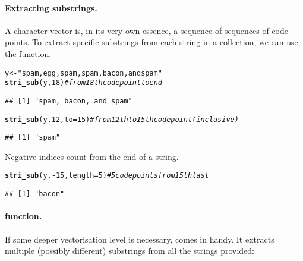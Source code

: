 \documentclass[nojss]{jss}\usepackage[]{graphicx}\usepackage[]{xcolor}
\makeatletter
\newcommand{\hlnum}[1]{\textcolor[rgb]{0.686,0.059,0.569}{#1}}%
\newcommand{\hlstr}[1]{\textcolor[rgb]{0.192,0.494,0.8}{#1}}%
\newcommand{\hlcom}[1]{\textcolor[rgb]{0.678,0.584,0.686}{\textit{#1}}}%
\newcommand{\hlopt}[1]{\textcolor[rgb]{0,0,0}{#1}}%
\newcommand{\hlstd}[1]{\textcolor[rgb]{0.345,0.345,0.345}{#1}}%
\newcommand{\hlkwb}[1]{\textcolor[rgb]{0.69,0.353,0.396}{#1}}%
\newcommand{\hlkwc}[1]{\textcolor[rgb]{0.333,0.667,0.333}{#1}}%
\newcommand{\hlkwd}[1]{\textcolor[rgb]{0.737,0.353,0.396}{\textbf{#1}}}%
\newenvironment{kframe}{%
 \def\at@end@of@kframe{}%
 \ifinner\ifhmode%
  \def\at@end@of@kframe{\end{minipage}}%
  \begin{minipage}{\columnwidth}%
 \fi\fi%
 \def\FrameCommand##1{\hskip\@totalleftmargin \hskip-\fboxsep
 \colorbox{shadecolor}{##1}\hskip-\fboxsep
     \hskip-\linewidth \hskip-\@totalleftmargin \hskip\columnwidth}%
 \MakeFramed {\advance\hsize-\width
   \@totalleftmargin\z@ \linewidth\hsize
   \@setminipage}}%
 {\par\unskip\endMakeFramed%
 \at@end@of@kframe}
\newenvironment{knitrout}{}{} %
\makeatother
\begin{document}
\paragraph{Extracting substrings.}
A character vector is, in its very own essence, a sequence of
sequences of code points.
To extract specific substrings from each string in a collection,
we can use the  function.

\begin{knitrout}
\color{fgcolor}\begin{kframe}
\begin{alltt}
\hlstd{y} \hlkwb{<-} \hlstr{"spam, egg, spam, spam, bacon, and spam"}
\hlkwd{stri_sub}\hlstd{(y,} \hlnum{18}\hlstd{)}             \hlcom{# from 18th code point to end}
\end{alltt}
\begin{verbatim}
## [1] "spam, bacon, and spam"
\end{verbatim}
\begin{alltt}
\hlkwd{stri_sub}\hlstd{(y,} \hlnum{12}\hlstd{,} \hlkwc{to}\hlstd{=}\hlnum{15}\hlstd{)}      \hlcom{# from 12th to 15th code point (inclusive)}
\end{alltt}
\begin{verbatim}
## [1] "spam"
\end{verbatim}
\end{kframe}
\end{knitrout}

Negative indices count from the end of a string.

\begin{knitrout}
\color{fgcolor}\begin{kframe}
\begin{alltt}
\hlkwd{stri_sub}\hlstd{(y,} \hlopt{-}\hlnum{15}\hlstd{,} \hlkwc{length}\hlstd{=}\hlnum{5}\hlstd{)}  \hlcom{# 5 code points from 15th last}
\end{alltt}
\begin{verbatim}
## [1] "bacon"
\end{verbatim}
\end{kframe}
\end{knitrout}




\paragraph{ function.}
If some deeper vectorisation level is necessary, 
comes in handy. It extracts multiple (possibly different) substrings
from all the strings provided:
\end{document}
